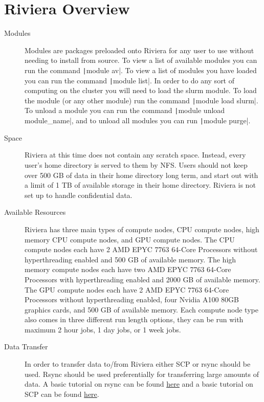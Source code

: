 \documentclass[11pt,letterpaper]{article}
\begin{document}
\section{Riviera Overview}
\begin{description}
    \item[Modules] Modules are packages preloaded onto Riviera for any user to use without needing to install from source. To view a list of available modules you can run the command \texttt|module av|. To view a list of modules you have loaded you can run the command \texttt|module list|. In order to do any sort of computing on the cluster you will need to load the slurm module. To load the module (or any other module) run the command \texttt|module load slurm|. To unload a module you can run the command \texttt|module unload module_name|, and to unload all modules you can run \texttt|module purge|.
    \item[Space] Riviera at this time does not contain any scratch space. Instead, every user's home directory is served to them by NFS. Users should not keep over 500 GB of data in their home directory long term, and start out with a limit of 1 TB of available storage in their home directory. Riviera is not set up to handle confidential data.
    \item[Available Resources] Riviera has three main types of compute nodes, CPU compute nodes, high memory CPU compute nodes, and GPU compute nodes. The CPU compute nodes each have 2 AMD EPYC 7763 64-Core Processors without hyperthreading enabled and 500 GB of available memory. The high memory compute nodes each have two AMD EPYC 7763 64-Core Processors with hyperthreading enabled and 2000 GB of available memory. The GPU compute nodes each have 2 AMD EPYC 7763 64-Core Processors without hyperthreading enabled, four Nvidia A100 80GB graphics cards, and 500 GB of available memory. Each compute node type also comes in three different run length options, they can be run with maximum 2 hour jobs, 1 day jobs, or 1 week jobs.
    \item[Data Transfer] In order to transfer data to/from Riviera either SCP or rsync should be used. Rsync should be used preferentially for transferring large amounts of data. A basic tutorial on rsync can be found \href{https://linuxize.com/post/how-to-use-rsync-for-local-and-remote-data-transfer-and-synchronization/}{here} and a basic tutorial on SCP can be found \href{https://linuxize.com/post/how-to-use-scp-command-to-securely-transfer-files/}{here}.

\end{description}
\end{document}
